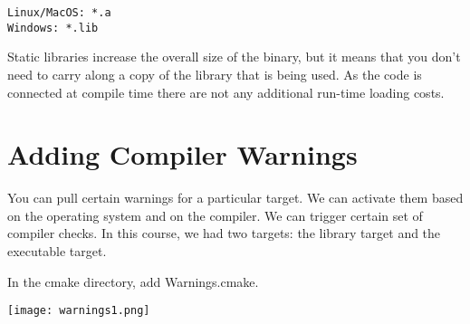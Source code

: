 \begin{verbatim}
Linux/MacOS: *.a
Windows: *.lib
\end{verbatim}

Static libraries increase the overall size of the binary, but it means that you don't need to carry along a copy of the library that is being used.
As the code is connected at compile time there are not any additional run-time loading costs.

\section{Adding Compiler Warnings}

You can pull certain warnings for a particular target. We can activate them based on the operating system and on the compiler.
We can trigger certain set of compiler checks. In this course, we had two targets: the library target and the executable target.

In the cmake directory, add Warnings.cmake. 


\begin{center}
    \texttt{[image: warnings1.png]}
\end{center}

